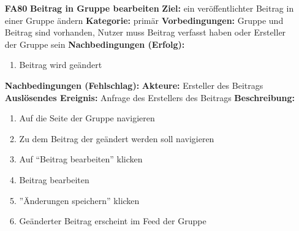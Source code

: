 \documentclass[parskip=full]{scrartcl}
\begin{document}
\begin{itemize}[nosep]
		\item[\textbf{FA80}]\textbf{Beitrag in Gruppe bearbeiten}
			\newline \textbf{Ziel:} ein veröffentlichter Beitrag in einer Gruppe ändern
			\newline \textbf{Kategorie:} primär
			\newline \textbf{Vorbedingungen:} Gruppe und Beitrag sind vorhanden, Nutzer muss Beitrag verfasst haben oder Ersteller der Gruppe sein
			\newline \textbf{Nachbedingungen (Erfolg):} 
			\begin{enumerate}[nosep]
				\item Beitrag wird geändert 
			\end{enumerate}
			\textbf{Nachbedingungen (Fehlschlag):}
			\newline \textbf{Akteure:} Ersteller des Beitrags
			\newline \textbf{Auslösendes Ereignis:} Anfrage des Erstellers des Beitrags
			\newline \textbf{Beschreibung:}
			\begin{enumerate}[nosep]
				\item Auf die Seite der Gruppe navigieren
				\item Zu dem Beitrag der geändert werden soll navigieren
				\item Auf “Beitrag bearbeiten” klicken
				\item Beitrag bearbeiten
				\item ”Änderungen speichern” klicken
				\item Geänderter Beitrag erscheint im Feed der Gruppe\\
			\end{enumerate}
						
		\end{itemize}
		
\end{document}
